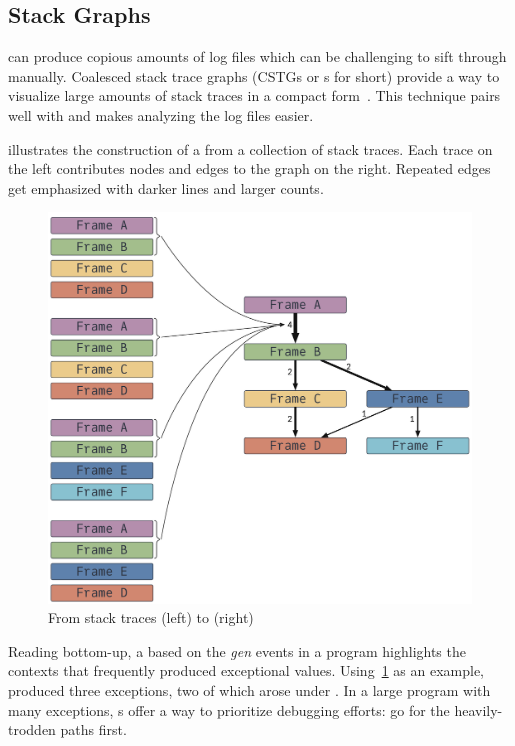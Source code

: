 \documentclass{juliacon}
\begin{document}
\subsection{Stack Graphs}
\label{s:cstg}

\TF{} can produce copious amounts of log files which can be challenging to sift through manually.
Coalesced stack trace graphs (CSTGs or \CSTG{}s for short) provide a way to visualize large amounts of stack traces in a compact form~\cite{humphreySystematicDebuggingMethods2014}.
This technique pairs well with \TF{} and makes analyzing the log files easier.

 illustrates the construction of a \CSTG{} from a collection of stack traces.
Each trace on the left contributes nodes and edges to the graph on the right.
Repeated edges get emphasized with darker lines and larger counts.

\begin{figure}[t]
  \centering
  \includegraphics[width=0.9\columnwidth]{./fig/cstg_static_diagram.pdf}
  \caption{From stack traces (left) to \CSTG{} (right)}
  \label{fig:cstg_demo}
\end{figure}

Reading bottom-up, a \CSTG{} based on the \emph{gen} events in a program
highlights the contexts that frequently produced exceptional values.
Using~\cref{fig:cstg_demo} as an example,  produced
three exceptions, two of which arose under .
In a large program with many exceptions, \CSTG{}s offer a way to prioritize
debugging efforts: go for the heavily-trodden paths first.
\end{document}
